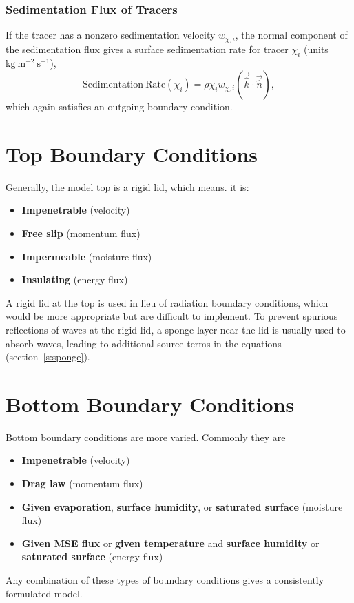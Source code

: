 \documentclass{report}
\begin{document}
\subsubsection{Sedimentation Flux of Tracers}

If the tracer has a nonzero sedimentation velocity $w_{\chi, i}$, the normal component of the sedimentation flux gives a surface sedimentation rate for tracer $\chi_i$ (units $\mathrm{kg~m^{-2}~s^{-1}}$), 
\begin{equation}
    \mathrm{Sedimentation~Rate}(\chi_i) = \rho \chi_{i} w_{\chi, i} (\vec{\hat k} \cdot \vec{\hat n}),
\end{equation}
which again satisfies an outgoing boundary condition. 

\section{Top Boundary Conditions} 

Generally, the model top is a rigid lid, which means. it is:
\begin{itemize}
    \item \textbf{Impenetrable} (velocity)
    \item \textbf{Free slip} (momentum flux)
    \item \textbf{Impermeable} (moisture flux)
    \item \textbf{Insulating} (energy flux)
\end{itemize}
A rigid lid at the top is used in lieu of radiation boundary conditions, which would be more appropriate but are difficult to implement. To prevent spurious reflections of waves at the rigid lid, a sponge layer near the lid is usually used to absorb waves, leading to additional source terms in the equations (section~\ref{s:sponge}).

\section{Bottom Boundary Conditions} \label{s:bottom_bc}

Bottom boundary conditions are more varied. Commonly they are
\begin{itemize}
    \item \textbf{Impenetrable} (velocity)
    \item \textbf{Drag law} (momentum flux)
    \item \textbf{Given evaporation}, \textbf{surface humidity}, or \textbf{saturated surface} (moisture flux)
    \item \textbf{Given MSE flux} or \textbf{given temperature} and \textbf{surface humidity} or \textbf{saturated surface} (energy flux)
\end{itemize}
Any combination of these types of boundary conditions gives a consistently formulated model.
\end{document}
